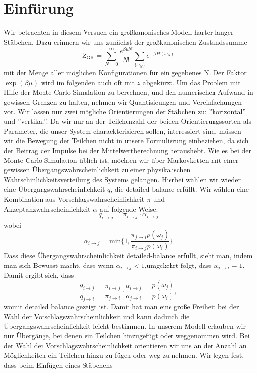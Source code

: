 \documentclass[12pt]{article}
\begin{document}
\section*{Einfürung}
Wir betrachten in diesem Versuch ein großkanonisches Modell harter langer Stäbchen. Dazu erinnern wir uns zunächst der großkanonischen Zustandssumme
$$Z_\text{GK}=\sum_{N=0}^{\infty}\frac{e^{\beta\mu{N}}}{N!}\sum_{\{\omega_N\}}e^{-\beta{H}(\omega_N)}$$
mit der Menge aller möglichen Konfigurationen für ein gegebenes N. Der Faktor $\exp(\beta\mu)$ wird im folgenden auch oft mit $z$ abgekürzt.
Um das Problem mit Hilfe der Monte-Carlo Simulation zu berechnen, und den numerischen Aufwand in gewissen Grenzen zu halten, nehmen wir Quantisieungen und Vereinfachungen vor. Wir lassen nur zwei mögliche Orientierungen der Stäbchen zu: ''horizontal'' und ''vertikal''. Da wir nur an der Teilchenzahl der beiden Orientierungssorten als Parameter, die unser System charackterisieren sollen, interessiert sind, müssen wir die Bewegung der Teilchen nicht in unsere Formulierung einbeziehen, da sich der Beitrag der Impulse bei der Mittelwertberechnung heraushebt.\newline
Wie es bei der Monte-Carlo Simulation üblich ist, möchten wir über Markovketten mit einer gewissen Übergangswahrscheinlichkeit zu einer physikalischen Wahrschinlichkeitsverteilung des Systems gelangen. Hierbei wählen wir wieder eine Übergangswahrscheinlichkeit $q$, die detailed balance erfüllt. Wir wählen eine Kombination aus Vorschlagswahrscheinlichkeit $\pi$ und Akzeptanzwahrscheinlichkeit $\alpha$ auf folgende Weise.
$$q_{i\rightarrow{j}}=\pi_{i\rightarrow{j}}\cdot\alpha_{i\rightarrow{j}}$$
wobei
$$\alpha_{i\rightarrow{j}}=\text{min}\Big\{1,\frac{\pi_{j\rightarrow{i}}p(\omega_j)}{\pi_{i\rightarrow{j}}p(\omega_i)}\Big\}$$
Dass diese Übergangswahrscheinlichkeit detailed-balance erfüllt, sieht man, indem man sich Bewusst macht, dass wenn $\alpha_{i\rightarrow{j}}<1$,umgekehrt folgt, dass $\alpha_{j\rightarrow{i}}=1$. Damit ergibt sich, dass
$$\frac{q_{i\rightarrow{j}}}{q_{j\rightarrow{i}}}=\frac{\pi_{i\rightarrow{j}}}{\pi_{j\rightarrow{i}}}\cdot\frac{\alpha_{i\rightarrow{j}}}{\alpha_{j\rightarrow{i}}}=\frac{p(\omega_j)}{p(\omega_i)},$$
womit detailed balance gezeigt ist. Damit hat man eine große Freiheit bei der Wahl der Vorschlagswahrscheinlichkeit und kann dadurch die Übergangswahrscheinlichkeit leicht bestimmen. In unserem Modell erlauben wir nur Übergänge, bei denen ein Teilchen hinzugefügt oder weggenommen wird. Bei der Wahl der Vorschlagswahrscheinlichkeit orientieren wir uns an der Anzahl an Möglichkeiten ein Teilchen hinzu zu fügen oder weg zu nehmen. Wir legen fest, dass beim Einfügen eines Stäbchens 
\end{document}

